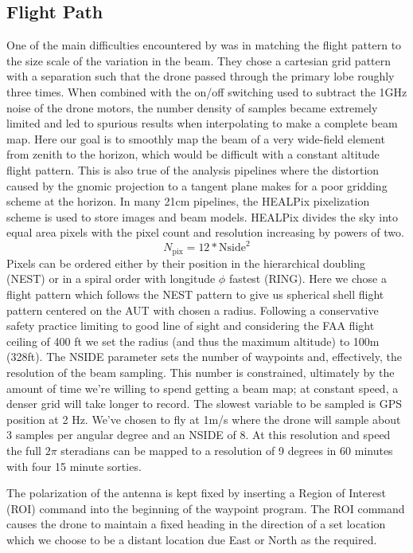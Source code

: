 \documentclass[preprint2,numberedappendix,tighten,twocolappendix]{aastex6}
\begin{document}
\subsection{Flight Path}
One of the main difficulties encountered by \citet{2015PASP..127.1131C} was in matching the flight pattern to the size scale of the variation in the beam.  They chose a cartesian grid pattern with a separation such that the drone passed through the primary lobe roughly three times.  When combined with the on/off switching used to subtract the 1GHz noise of the drone motors, the number density of samples became extremely limited and led to spurious results when interpolating to make a complete beam map.  Here our goal is to smoothly map the beam of a very wide-field element from zenith to the horizon, which would be difficult with a constant altitude flight pattern.  This is also true of the analysis pipelines where the distortion caused by the gnomic projection to a tangent plane makes for a poor gridding scheme at the horizon. In many 21cm pipelines, the HEALPix pixelization scheme \citep{Gorski:2005p7667} is used to store images and beam models.  HEALPix divides the sky into equal area pixels with the pixel count and resolution increasing by powers of two.
\begin{equation}
N_{\mathrm{pix}} = 12 * \mathrm{Nside}^2
\end{equation}
Pixels can be ordered either by their position in the hierarchical doubling (NEST) or in a spiral order with  longitude $\phi$ fastest (RING).  Here we chose a flight pattern which follows the NEST pattern to give us spherical shell flight pattern centered on the AUT with chosen a radius. Following a conservative safety practice limiting to good line of sight and considering the FAA flight ceiling of 400 ft we set the radius (and thus the maximum altitude) to 100m (328ft). The NSIDE parameter sets the number of waypoints and, effectively, the resolution of the beam sampling.  This number is constrained, ultimately by the amount of time we're willing to spend getting a beam map; at constant speed, a denser grid will take longer to record.  The slowest variable to be sampled is GPS position at 2 Hz. We've chosen to fly at 1m/s where the drone will sample about 3 samples per angular degree and an NSIDE of 8.  At this resolution and speed the full $2\pi$ steradians can be mapped to a resolution of 9 degrees in 60 minutes with four 15 minute sorties.

The polarization of the antenna is kept fixed by inserting a Region of Interest (ROI) command into the beginning of the waypoint program.  The ROI command causes the drone to maintain a fixed heading in the direction of a set location which we choose to be a distant location due East or North as the required.
\end{document}
